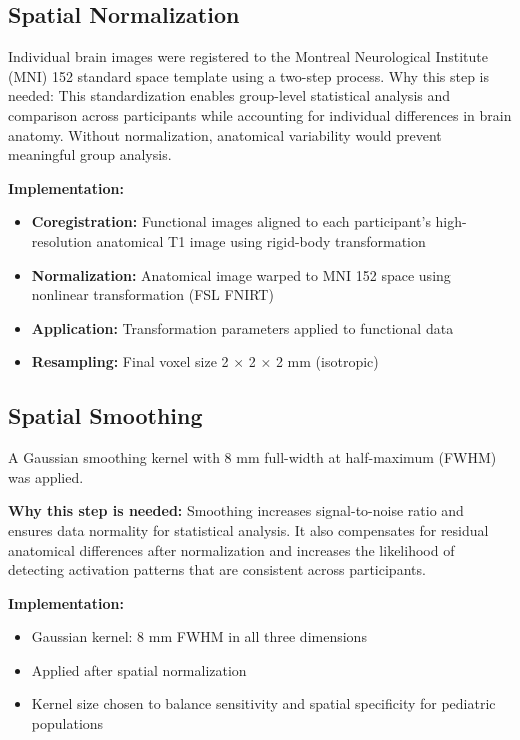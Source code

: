 \noindent
\subsection{Spatial Normalization}
Individual brain images were registered to the Montreal Neurological Institute (MNI) 152 standard space template using a two-step process.
Why this step is needed: This standardization enables group-level statistical analysis and comparison across participants while accounting for individual differences in brain anatomy. Without normalization, anatomical variability would prevent meaningful group analysis.

\textbf{Implementation:} 
\begin{itemize}
\item \textbf{Coregistration:} Functional images aligned to each participant's high-resolution anatomical T1 image using rigid-body transformation
\item \textbf{Normalization:} Anatomical image warped to MNI 152 space using nonlinear transformation (FSL FNIRT)
\item \textbf{Application:} Transformation parameters applied to functional data
\item \textbf{Resampling:} Final voxel size 2 × 2 × 2 mm (isotropic)
\end{itemize}


\subsection{Spatial Smoothing}
A Gaussian smoothing kernel with 8 mm full-width at half-maximum (FWHM) was applied.

\vspace{0.5\baselineskip}
\noindent
\textbf{Why this step is needed:} Smoothing increases signal-to-noise ratio and ensures data normality for statistical analysis. It also compensates for residual anatomical differences after normalization and increases the likelihood of detecting activation patterns that are consistent across participants.

\noindent
\textbf{Implementation:} 
\begin{itemize}
\item Gaussian kernel: 8 mm FWHM in all three dimensions
\item Applied after spatial normalization
\item Kernel size chosen to balance sensitivity and spatial specificity for pediatric populations
\end{itemize}


